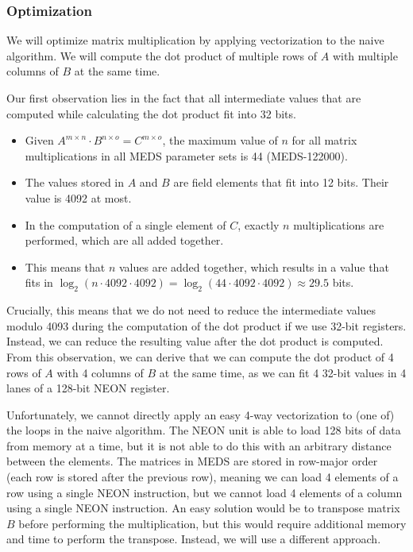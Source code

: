 \documentclass[11pt,a4paper]{report}
\theoremstyle{definition}
\begin{document}
\subsubsection{Optimization}
\label{sec:matrixmultiplicationoptimization}
We will optimize matrix multiplication by applying vectorization to the naive algorithm. We will compute the dot product of multiple rows of $A$ with multiple columns of $B$ at the same time.

Our first observation lies in the fact that all intermediate values that are computed while calculating the dot product fit into 32 bits.
\begin{itemize}
  \item Given $A^{m \times n} \cdot B^{n \times o} = C^{m \times o}$, the maximum value of $n$ for all matrix multiplications in all MEDS parameter sets is 44 (MEDS-122000).
  \item The values stored in $A$ and $B$ are field elements that fit into 12 bits. Their value is 4092 at most.
  \item In the computation of a single element of $C$, exactly $n$ multiplications are performed, which are all added together.
  \item This means that $n$ values are added together, which results in a value that fits in $\log_2(n \cdot 4092 \cdot 4092) = \log_2(44 \cdot 4092 \cdot 4092) \approx 29.5$ bits.
\end{itemize}
Crucially, this means that we do not need to reduce the intermediate values modulo 4093 during the computation of the dot product if we use 32-bit registers. Instead, we can reduce the resulting value after the dot product is computed. From this observation, we can derive that we can compute the dot product of 4 rows of $A$ with 4 columns of $B$ at the same time, as we can fit 4 32-bit values in 4 lanes of a 128-bit NEON register.

Unfortunately, we cannot directly apply an easy 4-way vectorization to (one of) the loops in the naive algorithm. The NEON unit is able to load 128 bits of data from memory at a time, but it is not able to do this with an arbitrary distance between the elements. The matrices in MEDS are stored in row-major order (each row is stored after the previous row), meaning we can load 4 elements of a row using a single NEON instruction, but we cannot load 4 elements of a column using a single NEON instruction. An easy solution would be to transpose matrix $B$ before performing the multiplication, but this would require additional memory and time to perform the transpose. Instead, we will use a different approach.
\end{document}
